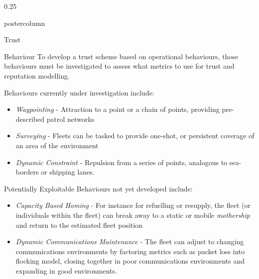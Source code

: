 \documentclass[final,hyperref={pdfpagelabels=false}]{beamer}
\def\colwidth{0.25\linewidth}
\begin{document}
\begin{frame}[fragile]
\begin{columns}[t]
\begin{column}{\colwidth}
\begin{beamercolorbox}[center,wd=\textwidth]{postercolumn}
\begin{minipage}[T]{.98\textwidth}
{\begin{block}{Trust}
            \end{block}
            \begin{block}{Behaviour}
              To develop a trust scheme based on operational behaviours, those behaviours must be investigated to assess what metrics to use for trust and reputation modelling. 

              \vspace{0.5\baselineskip}

              Behaviours currently under investigation include:
              \begin{itemize}
                \item \emph{Waypointing} - Attraction to a point or a chain of points, providing pre-described patrol networks
                \item \emph{Surveying} - Fleets can be tasked to provide one-shot, or persistent coverage of an area of the environment
                \item \emph{Dynamic Constraint} - Repulsion from a series of points, analogous to sea-borders or shipping lanes.
              \end{itemize}

              \vspace{0.5\baselineskip}

              Potentially Exploitable Behaviours not yet developed include:
              \begin{itemize}
                \item \emph{Capacity Based Homing} - For instance for refuelling or resupply, the fleet (or individuals within the fleet) can break 
                  away to a static or mobile \emph{mothership} and return to the estimated fleet position
                \item \emph{Dynamic Communications Maintenance} - The fleet can adjust to changing communications environments by factoring metrics such 
                  as packet loss into flocking model, closing together in poor communications environments and expanding in good environments.
              \end{itemize}
            \end{block}
          }
        \end{minipage}
      \end{beamercolorbox}
    \end{column}


\end{columns}
\end{frame}
\end{document}
